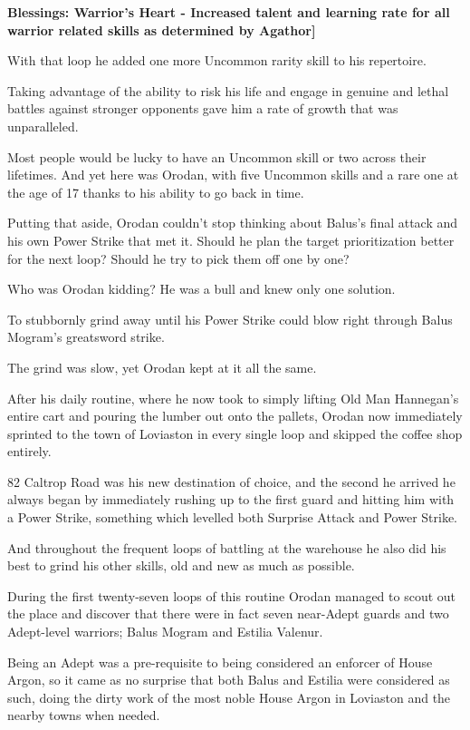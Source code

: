 \documentclass[a4paper,10pt]{book}
\begin{document}
\textbf{Blessings: Warrior’s Heart - Increased talent and learning rate for all warrior related skills as determined by Agathor]}\par
With that loop he added one more Uncommon rarity skill to his repertoire.\par
Taking advantage of the ability to risk his life and engage in genuine and lethal battles against stronger opponents gave him a rate of growth that was unparalleled.\par
Most people would be lucky to have an Uncommon skill or two across their lifetimes. And yet here was Orodan, with five Uncommon skills and a rare one at the age of 17 thanks to his ability to go back in time.\par
Putting that aside, Orodan couldn’t stop thinking about Balus’s final attack and his own Power Strike that met it. Should he plan the target prioritization better for the next loop? Should he try to pick them off one by one?\par
Who was Orodan kidding? He was a bull and knew only one solution.\par
To stubbornly grind away until his Power Strike could blow right through Balus Mogram’s greatsword strike.\par
\par
The grind was slow, yet Orodan kept at it all the same.\par
After his daily routine, where he now took to simply lifting Old Man Hannegan’s entire cart and pouring the lumber out onto the pallets, Orodan now immediately sprinted to the town of Loviaston in every single loop and skipped the coffee shop entirely.\par
82 Caltrop Road was his new destination of choice, and the second he arrived he always began by immediately rushing up to the first guard and hitting him with a Power Strike, something which levelled both Surprise Attack and Power Strike.\par
And throughout the frequent loops of battling at the warehouse he also did his best to grind his other skills, old and new as much as possible.\par
During the first twenty-seven loops of this routine Orodan managed to scout out the place and discover that there were in fact seven near-Adept guards and two Adept-level warriors; Balus Mogram and Estilia Valenur.\par
Being an Adept was a pre-requisite to being considered an enforcer of House Argon, so it came as no surprise that both Balus and Estilia were considered as such, doing the dirty work of the most noble House Argon in Loviaston and the nearby towns when needed.\par
\end{document}
